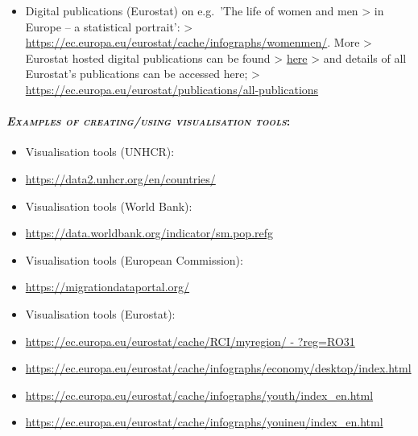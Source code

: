 \documentclass[
]{article}
\providecommand{\tightlist}{%
  \setlength{\itemsep}{0pt}\setlength{\parskip}{0pt}}
\begin{document}
\begin{itemize}
\tightlist
\item
  Digital publications (Eurostat) on e.g.~{'The life of women and men
  \textgreater{} in Europe -- a statistical portrait}':
  \textgreater{} \url{https://ec.europa.eu/eurostat/cache/infographs/womenmen/}. More
  \textgreater{} Eurostat hosted digital publications can be found
  \textgreater{} \href{https://ec.europa.eu/eurostat/publications/digital-publications?p_p_id=101_INSTANCE_lw69MeCcUVQY\&p_p_lifecycle=0\&p_p_state=normal\&p_p_mode=view\&p_p_col_id=column-2\&p_p_col_count=1\&_101_INSTANCE_lw69MeCcUVQY_delta=4\&_101_INSTANCE_lw69MeCcUVQY_keywords=\&_101_INSTANCE_lw69MeCcUVQY_advancedSearch=false\&_101_INSTANCE_lw69MeCcUVQY_andOperator=true\&p_r_p_564233524_resetCur=false\&_101_INSTANCE_lw69MeCcUVQY_cur=1}{here}
  \textgreater{} and details of all Eurostat's publications can be accessed here;
  \textgreater{} \url{https://ec.europa.eu/eurostat/publications/all-publications}
\end{itemize}

\hypertarget{examples-of-creatingusing-visualisation-tools-1}{%
\paragraph{\texorpdfstring{\emph{\textsc{Examples of creating/using visualisation tools}}:}{Examples of creating/using visualisation tools:}}\label{examples-of-creatingusing-visualisation-tools-1}}

\begin{itemize}
\item
  Visualisation tools (UNHCR):
\item
  \url{https://data2.unhcr.org/en/countries/}
\item
  Visualisation tools (World Bank):
\item
  \url{https://data.worldbank.org/indicator/sm.pop.refg}
\item
  Visualisation tools (European Commission):
\item
  \url{https://migrationdataportal.org/}
\item
  Visualisation tools (Eurostat):
\item
  \href{https://ec.europa.eu/eurostat/cache/RCI/myregion/\#?reg=RO31}{https://ec.europa.eu/eurostat/cache/RCI/myregion/ -
  ?reg=RO31}
\item
  \url{https://ec.europa.eu/eurostat/cache/infographs/economy/desktop/index.html}
\item
  \url{https://ec.europa.eu/eurostat/cache/infographs/youth/index_en.html}
\item
  \url{https://ec.europa.eu/eurostat/cache/infographs/youineu/index_en.html}
\end{itemize}
\end{document}
